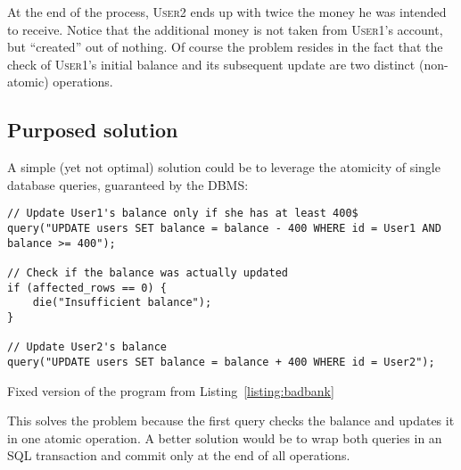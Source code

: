 At the end of the process, \textsc{User2} ends up with twice the money he was intended to receive. Notice that the additional money is not taken from \textsc{User1}'s account, but ``created'' out of nothing. Of course the problem resides in the fact that the check of \textsc{User1}'s initial balance and its subsequent update are two distinct (non-atomic) operations.

\subsection{Purposed solution}

A simple (yet not optimal) solution could be to leverage the atomicity of single database queries, guaranteed by the DBMS:

\begin{listing}[H]
\begin{verbatim}
// Update User1's balance only if she has at least 400$
query("UPDATE users SET balance = balance - 400 WHERE id = User1 AND balance >= 400");

// Check if the balance was actually updated
if (affected_rows == 0) {
    die("Insufficient balance");
}

// Update User2's balance
query("UPDATE users SET balance = balance + 400 WHERE id = User2");
\end{verbatim}
\caption{Fixed version of the program from Listing~\ref{listing:badbank}}
\label{listing:fix}
\end{listing}

This solves the problem because the first query checks the balance and updates it in one atomic operation. A better solution would be to wrap both queries in an SQL transaction and commit only at the end of all operations.
